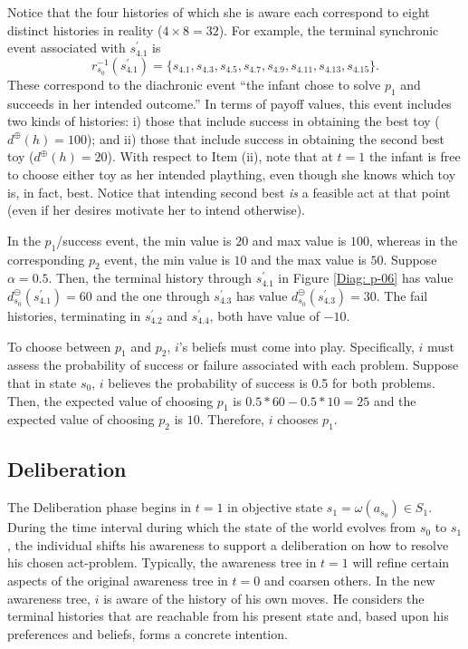 \documentclass[
11pt,
titlepage,
reqno,
]{article}%
\theoremstyle{definition}
\begin{document}
Notice that the four histories of which she is aware each correspond to eight distinct histories in reality ($4\times 8=32$).
For example, the terminal synchronic event associated with $s_{4.1}^\prime$ is
\[ 
	r^{-1}_{s_0}(s_{4.1}^\prime)=\{s_{4.1},s_{4.3},s_{4.5},s_{4.7},s_{4.9},s_{4.11},s_{4.13},s_{4.15}\}.
\]
These correspond to the diachronic event ``the infant chose  to solve $p_1$ and succeeds in her intended outcome.''
In terms of payoff values, this event includes two kinds of histories: i) those that include success in obtaining the best toy ($d^\oplus(h)=100$); and ii) those that include success in obtaining the second best toy ($d^\oplus(h)=20$).
With respect to Item (ii), note that at $t=1$ the infant is free to choose either toy as her intended plaything, even though she knows which toy is, in fact, best.
Notice that intending second best \textit{is} a feasible act at that point (even if her desires motivate her to intend otherwise).

In the  $p_1$/success event, the min value is $20$ and max value is $100$, whereas in the corresponding $p_2$ event, the min value is $10$ and the max value is $50$.
Suppose $\alpha=0.5$. 
Then, the terminal history through $s^\prime_{4.1}$ in Figure \ref{Diag: p-06} has value $d^\ominus_{s_0}(s^\prime_{4.1})=60$ and the one through  $s^\prime_{4.3}$  has value $d^\ominus_{s_0}(s^\prime_{4.3})=30$.
The fail histories, terminating in $s^\prime_{4.2}$ and $s^\prime_{4.4}$,  both have value of $-10$.


To choose between $p_1$ and $p_2$, $i$'s beliefs must come into play.
Specifically, $i$ must assess the probability of success or failure associated with each problem. 
Suppose that in state $s_0$, $i$  believes the probability of success is 0.5 for both problems. 
Then, the expected value of choosing $p_1$ is $0.5*60-0.5*10=25$ and the expected value of choosing $p_2$ is $10$.
Therefore, $i$ chooses $p_1$.


\subsection{Deliberation}
The Deliberation phase begins in $t=1$ in objective state $s_1=\omega(a_{s_0})\in S_1$.
During the time interval during which the state of the world evolves from  $s_0$ to $s_1$, the individual shifts his awareness to support a deliberation on how to resolve his chosen act-problem. 
Typically, the awareness tree in $t=1$ will refine certain aspects of the original awareness tree in $t=0$ and coarsen others.
In the new awareness tree, $i$ is aware of the history of his own moves.
He considers the terminal histories that are reachable from his present state and, based upon his preferences and beliefs, forms a concrete intention.
\end{document}
